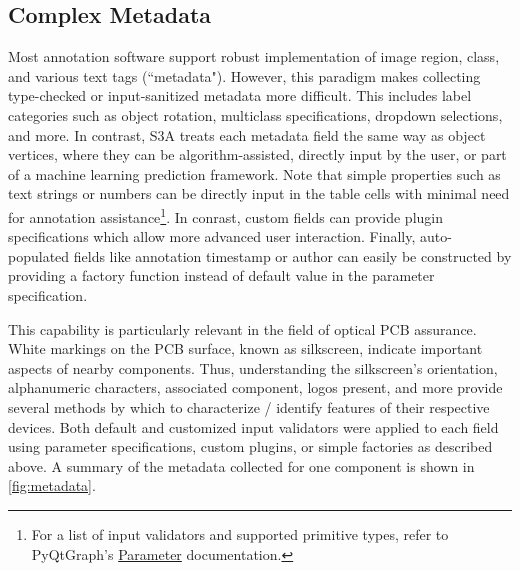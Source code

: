 \subsection{Complex Metadata}
Most annotation software support robust implementation of image region, class, and various text tags (``metadata"). However, this paradigm makes collecting type-checked or input-sanitized metadata more difficult. This includes label categories such as object rotation, multiclass specifications, dropdown selections, and more. In contrast, S3A treats each metadata field the same way as object vertices, where they can be algorithm-assisted, directly input by the user, or part of a machine learning prediction framework. Note that simple properties such as text strings or numbers can be directly input in the table cells with minimal need for annotation assistance\footnote{For a list of input validators and supported primitive types, refer to PyQtGraph's \href{https://pyqtgraph.readthedocs.io/en/latest/parametertree/parametertypes.html}{Parameter} documentation.}. In conrast, custom fields can provide plugin specifications which allow more advanced user interaction. Finally, auto-populated fields like annotation timestamp or author can easily be constructed by providing a factory function instead of default value in the parameter specification.

This capability is particularly relevant in the field of optical PCB assurance. White markings on the PCB surface, known as silkscreen, indicate important aspects of nearby components. Thus, understanding the silkscreen's orientation, alphanumeric characters, associated component, logos present, and more provide several methods by which to characterize / identify features of their respective devices. Both default and customized input validators were applied to each field using parameter specifications, custom plugins, or simple factories as described above. A summary of the metadata collected for one component is shown in \autoref{fig:metadata}.

\makeMetadataFig

